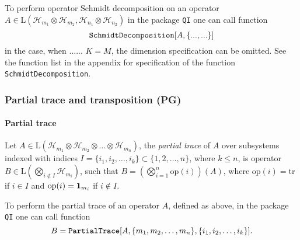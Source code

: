 \documentclass[11pt,a4paper]{article}
\newcommand{\qi}{\texttt{QI}}
\newcommand{\res}{\mathrm{res}}
\newcommand{\ket}[1]{\ensuremath{|#1\rangle}}
\newcommand{\bra}[1]{\ensuremath{\langle#1|}}
\newcommand{\ketbra}[2]{\ensuremath{\ket{#1}\bra{#2}}}
\newcommand{\Hilb}[1]{\mathcal{H}_{#1}}
\newcommand{\Lin}{\mathrm{L}}
\newcommand{\tr}{\mathrm{tr}}
\newcommand{\1}{{\bf 1}}
\newcommand{\fname}[1]{\text{\texttt{#1}}}
\begin{document}
To perform operator Schmidt decomposition on an operator $A \in \Lin(\Hilb{m_1}\otimes \Hilb{m_2},\Hilb{n_1}\otimes \Hilb{n_2})$ 
in the package \qi{} one can call function
\begin{equation}
\fname{SchmidtDecomposition}[ A, \{... , ... \}]
\end{equation} 
in the case, when ...... $K=M$, the dimension specification can be omitted.
See the function list in the appendix for specification of the function
\texttt{SchmidtDecomposition}.


\subsubsection{Partial trace and transposition (PG)}
\paragraph{Partial trace}
Let $A\in \Lin(\Hilb{m_1}\otimes \Hilb{m_2}\otimes \ldots \otimes \Hilb{m_n})$,
the \emph{partial trace} of $A$ over subsystems indexed with indices 
$I=\{i_1, i_2, \ldots, i_k\}\subset \{1,2,\ldots, n\}$, where $k\leq n$, is 
operator $B\in \Lin(\bigotimes_{i\notin I} \Hilb{m_i})$, such that
$B=(\bigotimes_{i=1}^{n} \mathrm{op}(i))(A)$, where $\mathrm{op}(i)=\tr$ if 
$i\in I$ and $\mathrm{op}(i)=\1_{m_i}$ if $i\notin I$.

To perform the partial trace of an operator $A$, defined as above, in the 
package \qi{} one can call function
\begin{equation}
B=\fname{PartialTrace}[A, \{m_1, m_2, \ldots, m_n\}, \{i_1, i_2, 
\ldots, i_k\}].
\end{equation} 
\end{document}

